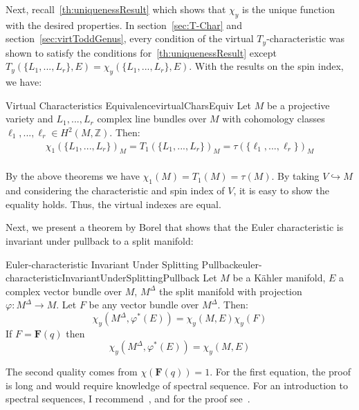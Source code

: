 \documentclass{book}
\newenvironment{Proof}[1][]
  {\begin{ProofTcb}[#1]}
  {\end{ProofTcb}}
\newcommand{\Z}{{\mathbb{Z}}}
\renewcommand{\phi}{\varphi}
\begin{document}
Next, recall~\cref{th:uniquenessResult} which shows that $\chi_y$ is the unique function with the desired
properties. In section~\ref{sec:T-Char} and section~\ref{sec:virtToddGenus}, every condition of the virtual
$T_y$-characteristic was shown to satisfy the conditions for~\cref{th:uniquenessResult} except $T_y(\{L_1,...,
L_r\},E) = \chi_y(\{L_1,..., L_r\},E)$. With the results on the spin index, we have:

\begin{thm}{Virtual Characteristics Equivalence}{virtualCharsEquiv}
  Let $M$ be a projective variety and $L_1,..., L_r$ complex line bundles over $M$ with cohomology classes
  $\ell_1, ..., \ell_r \in H^2(M, \Z)$. Then:
  \begin{align*}
    \chi_1(\{L_1, ..., L_r\})_M = T_1(\{L_1, ..., L_r\})_M = \tau(\{\ell_1, ..., \ell_r\})_M\\
  \end{align*}
\end{thm}

\begin{Proof}
  By the above theorems we have $\chi_1(M) = T_1(M) = \tau(M)$. By taking $V \hookrightarrow M$ and
  considering the characteristic and spin index of $V$, it is easy to
  show the equality holds. Thus, the virtual indexes are equal.
\end{Proof}

Next, we present a theorem by Borel that shows that the Euler characteristic is invariant under pullback to
a split manifold:

\begin{thm}{Euler-characteristic Invariant Under Splitting Pullback}{euler-characteristicInvariantUnderSplittingPullback}
  Let $M$ be a K\"ahler manifold, $E$ a complex vector bundle over $M$, $M^\Delta$ the split manifold with projection
  $\phi: M^\Delta \to M$. Let $F$ be any vector bundle over $M^\Delta$. Then:
  \[
    \chi_y(M^\Delta, \phi^*(E)) = \chi_y(M, E)\chi_y(F)
  \]
  If $F = \mathbf{F}(q)$ then
  \[
    \chi_y(M^\Delta, \phi^*(E)) = \chi_y(M, E)
  \]
\end{thm}

\begin{Proof}
  The second quality comes from $\chi(\mathbf{F}(q)) =1$. For the first equation, the proof is long and would
  require knowledge of spectral sequence. For an introduction to spectral sequences, I
  recommend~\cite{hatcherSpectralSequences}, and for the proof
  see~\cite[Appendix~2]{hirzebruchTopologicalMethodsAlgebraic1995}.
\end{Proof}
\end{document}
